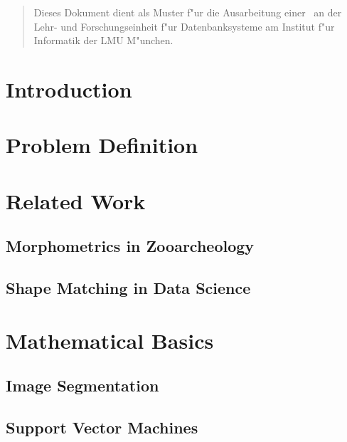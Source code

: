 \documentclass[pdftex,12pt,a4paper]{report}
\begin{document}
\deckblatt

\erklaerung

\begin{abstract}
Dieses Dokument dient als Muster f"ur die Ausarbeitung einer \the\arbeit\
an der Lehr- und Forschungseinheit f"ur Datenbanksysteme am Institut f"ur
Informatik der LMU M"unchen.
\end{abstract}

\tableofcontents

\chapter{Introduction}

\chapter{Problem Definition}

\chapter{Related Work}

\section{Morphometrics in Zooarcheology}

\cite{blackith1971multivariate}
\cite{adams2004geometric}
\cite{mitteroecker2009advances}

\section{Shape Matching in Data Science}

\cite{da2010shape}
\cite{veltkamp2001shape}
\cite{belongie2002shape}
\cite{mhamdi2014local}

\chapter{Mathematical Basics}

\section{Image Segmentation}

\cite{van2014scikit}

\section{Support Vector Machines}
\end{document}
